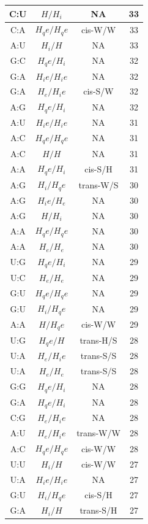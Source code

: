 \begin{center}
\begin{longtable}{c|c|c|c}
C:U & $H/H_i$ & NA & 33 \\  \hline
C:A & $H_qe/H_qe$ & cis-W/W & 33 \\  \hline
A:U & $H_i/H$ & NA & 33 \\  \hline
G:C & $H_qe/H_i$ & NA & 32 \\  \hline
G:A & $H_ie/H_ie$ & NA & 32 \\  \hline
G:A & $H_e/H_ie$ & cis-S/W & 32 \\  \hline
A:G & $H_qe/H_i$ & NA & 32 \\  \hline
A:U & $H_ie/H_ie$ & NA & 31 \\  \hline
A:C & $H_qe/H_qe$ & NA & 31 \\  \hline
A:C & $H/H$ & NA & 31 \\  \hline
A:A & $H_qe/H_i$ & cis-S/H & 31 \\  \hline
A:G & $H_i/H_qe$ & trans-W/S & 30 \\  \hline
A:G & $H_ie/H_e$ & NA & 30 \\  \hline
A:G & $H/H_i$ & NA & 30 \\  \hline
A:A & $H_qe/H_qe$ & NA & 30 \\  \hline
A:A & $H_e/H_e$ & NA & 30 \\  \hline
U:G & $H_qe/H_i$ & NA & 29 \\  \hline
U:C & $H_e/H_e$ & NA & 29 \\  \hline
G:U & $H_qe/H_qe$ & NA & 29 \\  \hline
G:U & $H_i/H_qe$ & NA & 29 \\  \hline
A:A & $H/H_qe$ & cis-W/W & 29 \\  \hline
U:G & $H_qe/H$ & trans-H/S & 28 \\  \hline
U:A & $H_e/H_ie$ & trans-S/S & 28 \\  \hline
U:A & $H_e/H_e$ & trans-S/S & 28 \\  \hline
G:G & $H_qe/H_i$ & NA & 28 \\  \hline
G:A & $H_qe/H_i$ & NA & 28 \\  \hline
C:G & $H_e/H_ie$ & NA & 28 \\  \hline
A:U & $H_e/H_ie$ & trans-W/W & 28 \\  \hline
A:C & $H_qe/H_qe$ & cis-W/W & 28 \\  \hline
U:U & $H_i/H$ & cis-W/W & 27 \\  \hline
U:A & $H_ie/H_ie$ & NA & 27 \\  \hline
G:U & $H_i/H_qe$ & cis-S/H & 27 \\  \hline
G:A & $H_i/H$ & trans-S/H & 27 \\  \hline

\end{longtable}
\end{center}

